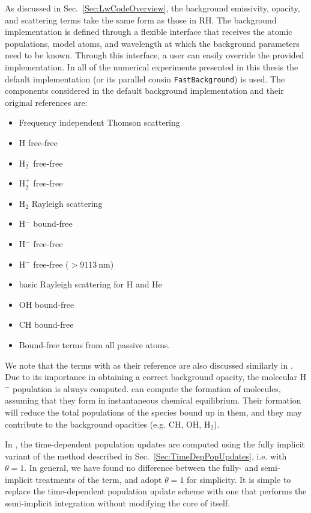 As discussed in Sec.~\ref{Sec:LwCodeOverview}, the background emissivity, opacity, and scattering terms take the same form as those in RH.
The background implementation is defined through a flexible interface that receives the atomic populations, model atoms, and wavelength at which the background parameters need to be known.
Through this interface, a user can easily override the provided implementation.
In all of the numerical experiments presented in this thesis the default implementation (or its parallel cousin \texttt{FastBackground}) is used.
The components considered in the default background implementation and their original references are:
\begin{itemize}
    \itemsep-0.5em
    \item Frequency independent Thomson scattering \citep{Mihalas1978}
    \item H free-free \citep{Mihalas1978}
    \item H$_2^-$ free-free \citep{Bell1980}
    \item H$_2^+$ free-free \citep{Bates1952}
    \item H$_2$ Rayleigh scattering \citep{Victor1969,Tarafdar1973}
    \item H$^-$ bound-free \citep{Geltman1962,Mihalas1978}
    \item H$^-$ free-free \citep{Stilley1970,Mihalas1978}
    \item H$^-$ free-free ($>\SI{9113}{\nano\m}$) \citep{John1988}
    \item basic Rayleigh scattering for H and He \citep{Mihalas1978}
    \item OH bound-free \citep{Kurucz1987}
    \item CH bound-free \citep{Kurucz1987}
    \item Bound-free terms from all passive atoms.
\end{itemize}
We note that the terms with \citep{Mihalas1978} as their reference are also discussed similarly in \citet{Hubeny2014}.
Due to its importance in obtaining a correct background opacity, the molecular H$^-$ population is always computed.
\Lw{} can compute the formation of molecules, assuming that they form in instantaneous chemical equilibrium.
Their formation will reduce the total populations of the species bound up in them, and they may contribute to the background opacities (e.g. CH, OH, H$_2$).

In \Lw{}, the time-dependent population updates are computed using the fully implicit variant of the method described in Sec.~\ref{Sec:TimeDepPopUpdates}, i.e. with $\theta=1$.
In general, we have found no difference between the fully- and semi-implicit treatments of the term, and adopt $\theta=1$ for simplicity.
It is simple to replace the time-dependent population update scheme with one that performs the semi-implicit integration without modifying the core of \Lw{} itself.


